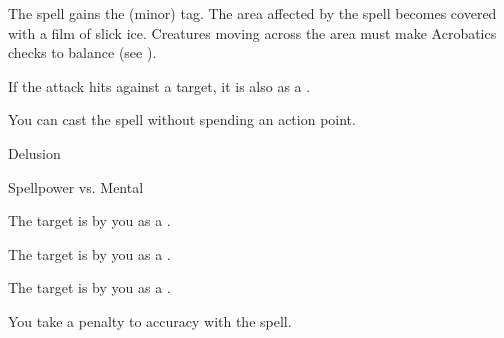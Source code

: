 
The spell gains the  (minor) tag.
The area affected by the spell becomes covered with a film of slick ice.
Creatures moving across the area must make Acrobatics checks to balance (see ).







If the attack hits against a target, it is also  as a .






You can cast the spell without spending an action point.




\newpage
\begin{spellsection}{Delusion}

\begin{spellheader}
\end{spellheader}

\begin{spellcontent}

\begin{spelltargetinginfo}




\end{spelltargetinginfo}


\begin{spelleffects}




\begin{spellattack}{Spellpower vs. Mental}


\hit The target is \frightened by you as a .


\crit The target is \panicked by you as a .


\miss The target is \shaken by you as a .


\end{spellattack}





\end{spelleffects}

\end{spellcontent}
\begin{spellfooter}


\end{spellfooter}
\begin{spellsubcontent}


\begin{spellcantrip}

You take a  penalty to accuracy with the spell.

\end{spellcantrip}


\end{spellsubcontent}
\end{spellsection}


